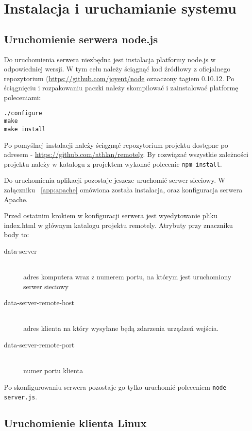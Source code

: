 \section{Instalacja i uruchamianie systemu}

\subsection{Uruchomienie serwera node.js}

Do uruchomienia serwera niezbędna jest instalacja platformy node.js w odpowiedniej wersji. W tym celu należy ściągnąć kod źródłowy z oficjalnego repozytorium (\url{https://github.com/joyent/node} oznaczony tagiem 0.10.12. Po ściągnięciu i rozpakowaniu paczki należy skompilować i zainstalować platformę poleceniami:

\begin{lstlisting}
./configure
make
make install
\end{lstlisting}

Po pomyślnej instalacji należy ściągnąć repozytorium projektu dostępne po adresem - \url{https://github.com/athlan/remotely}. By rozwiązać wszystkie zależności projektu należy w katalogu z projektem wykonać polecenie \lstinline{npm install}.
\par
Do uruchomienia aplikacji pozostaje jeszcze uruchomić serwer sieciowy. W załączniku ~\ref{app:apache} omówiona została instalacja, oraz konfiguracja serwera Apache.
\par
Przed ostatnim krokiem w konfiguracji serwera jest wyedytowanie pliku index.html w głównym katalogu projektu remotely. Atrybuty przy znaczniku body to:
\begin{description}
	\item[data-server] \hfill \\
		adres komputera wraz z numerem portu, na którym jest uruchomiony serwer sieciowy
	\item[data-server-remote-host] \hfill \\
		adres klienta na który wysyłane będą zdarzenia urządzeń wejścia.
	\item[data-server-remote-port] \hfill \\
		numer portu klienta
\end{description}
\par
Po skonfigurowaniu serwera pozostaje go tylko uruchomić poleceniem \lstinline{node server.js}.


\subsection{Uruchomienie klienta Linux}


